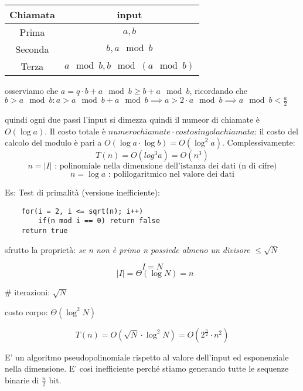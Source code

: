 \begin{table}[!ht]
    \centering
    \begin{tabular}{c|c}
        Chiamata & input \\
        \hline
        Prima & $a, b$ \\
        Seconda & $b, a \mod b$ \\
        Terza & $a \mod b, b \mod (a \mod b)$ \\
    \end{tabular}
\end{table}
osserviamo che $a = q \cdot b + a \mod b \geq b + a \mod b$, ricordando che $b > a \mod b : a > a \mod b + a \mod b \implies a > 2 \cdot a \mod b \implies a \mod b < \frac{a}{2}$

quindi ogni due passi l'input si dimezza quindi il numeor di chiamate è $O\left( \log a \right)$. Il costo totale è $numero chiamate \cdot costo singola chiamata$: il costo del calcolo del modulo è pari a $O\left( \log a \cdot \log b\right ) = O\left( \log^{2}a \right)$. Complessivamente:
$$ T\left(n\right) = O\left(log^{3}a\right) = O\left( n^{3} \right) $$
$$ n = |I| \text{ : polinomiale nella dimensione dell'istanza dei dati (n di cifre)} $$
$$ n = \log a \text{ : polilogaritmico nel valore dei dati} $$

Es: Test di primalità (versione inefficiente):
\begin{verbatim}
    for(i = 2, i <= sqrt(n); i++)
        if(n mod i == 0) return false
    return true
\end{verbatim}
sfrutto la proprietà: \emph{se n non è primo n possiede almeno un divisore $\leq \sqrt{N}$}

$$ I = N $$
$$ \text{  } |I|=\Theta\left( \log N \right) = n $$

\# iterazioni: $\sqrt{N}$

costo corpo: $\Theta\left( \log^{2}N \right)$

$$ T\left(n\right) = O\left(\sqrt{N} \cdot \log^{2}N \right) = O\left(2^{\frac{n}{2}} \cdot n^{2}\right) $$

E' un algoritmo pseudopolinomiale rispetto al valore dell'input ed esponenziale nella dimensione. E' così inefficiente perché stiamo generando tutte le sequenze binarie di $\frac{n}{2}$ bit.